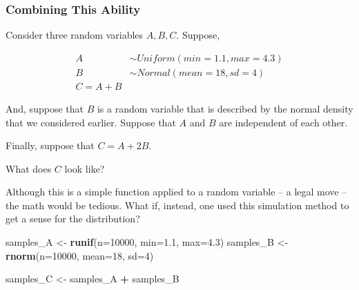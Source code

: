\documentclass[
]{book}
\newenvironment{Shaded}{\begin{snugshade}}{\end{snugshade}}
\newcommand{\AttributeTok}[1]{\textcolor[rgb]{0.13,0.29,0.53}{#1}}
\newcommand{\DecValTok}[1]{\textcolor[rgb]{0.00,0.00,0.81}{#1}}
\newcommand{\FloatTok}[1]{\textcolor[rgb]{0.00,0.00,0.81}{#1}}
\newcommand{\FunctionTok}[1]{\textcolor[rgb]{0.13,0.29,0.53}{\textbf{#1}}}
\newcommand{\NormalTok}[1]{#1}
\newcommand{\OtherTok}[1]{\textcolor[rgb]{0.56,0.35,0.01}{#1}}
\newcommand{\SpecialCharTok}[1]{\textcolor[rgb]{0.81,0.36,0.00}{\textbf{#1}}}
\theoremstyle{definition}
\theoremstyle{definition}
\theoremstyle{definition}
\theoremstyle{definition}
\theoremstyle{remark}
\begin{document}
\hypertarget{combining-this-ability}{%
\subsubsection{Combining This Ability}\label{combining-this-ability}}

Consider three random variables \(A, B, C\). Suppose,

\[ 
  \begin{aligned}
    A & \sim Uniform(min=1.1, max=4.3) \\ 
    B & \sim Normal(mean=18, sd=4)     \\ 
    C = A + B
  \end{aligned}
\]

And, suppose that \(B\) is a random variable that is described by the normal density that we considered earlier. Suppose that \(A\) and \(B\) are independent of each other.

Finally, suppose that \(C = A + 2B\).

What does \(C\) look like?

Although this is a simple function applied to a random variable -- a legal move -- the math would be tedious. What if, instead, one used this simulation method to get a sense for the distribution?

\begin{Shaded}
\begin{Highlighting}[]
\NormalTok{samples\_A }\OtherTok{\textless{}{-}} \FunctionTok{runif}\NormalTok{(}\AttributeTok{n=}\DecValTok{10000}\NormalTok{, }\AttributeTok{min=}\FloatTok{1.1}\NormalTok{, }\AttributeTok{max=}\FloatTok{4.3}\NormalTok{)}
\NormalTok{samples\_B }\OtherTok{\textless{}{-}} \FunctionTok{rnorm}\NormalTok{(}\AttributeTok{n=}\DecValTok{10000}\NormalTok{, }\AttributeTok{mean=}\DecValTok{18}\NormalTok{, }\AttributeTok{sd=}\DecValTok{4}\NormalTok{)}

\NormalTok{samples\_C }\OtherTok{\textless{}{-}}\NormalTok{ samples\_A }\SpecialCharTok{+}\NormalTok{ samples\_B}
\end{Highlighting}
\end{Shaded}
\end{document}
